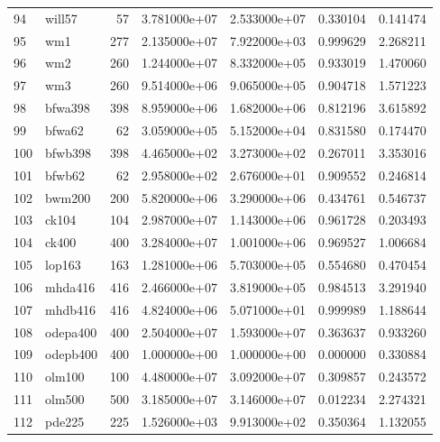 \begin{tabular}{llrrrrr}
94  &                   will57 &    57 &  3.781000e+07 &  2.533000e+07 &  0.330104 &   0.141474 \\
95  &                      wm1 &   277 &  2.135000e+07 &  7.922000e+03 &  0.999629 &   2.268211 \\
96  &                      wm2 &   260 &  1.244000e+07 &  8.332000e+05 &  0.933019 &   1.470060 \\
97  &                      wm3 &   260 &  9.514000e+06 &  9.065000e+05 &  0.904718 &   1.571223 \\
98  &                  bfwa398 &   398 &  8.959000e+06 &  1.682000e+06 &  0.812196 &   3.615892 \\
99  &                   bfwa62 &    62 &  3.059000e+05 &  5.152000e+04 &  0.831580 &   0.174470 \\
100 &                  bfwb398 &   398 &  4.465000e+02 &  3.273000e+02 &  0.267011 &   3.353016 \\
101 &                   bfwb62 &    62 &  2.958000e+02 &  2.676000e+01 &  0.909552 &   0.246814 \\
102 &                   bwm200 &   200 &  5.820000e+06 &  3.290000e+06 &  0.434761 &   0.546737 \\
103 &                    ck104 &   104 &  2.987000e+07 &  1.143000e+06 &  0.961728 &   0.203493 \\
104 &                    ck400 &   400 &  3.284000e+07 &  1.001000e+06 &  0.969527 &   1.006684 \\
105 &                   lop163 &   163 &  1.281000e+06 &  5.703000e+05 &  0.554680 &   0.470454 \\
106 &                  mhda416 &   416 &  2.466000e+07 &  3.819000e+05 &  0.984513 &   3.291940 \\
107 &                  mhdb416 &   416 &  4.824000e+06 &  5.071000e+01 &  0.999989 &   1.188644 \\
108 &                 odepa400 &   400 &  2.504000e+07 &  1.593000e+07 &  0.363637 &   0.933260 \\
109 &                 odepb400 &   400 &  1.000000e+00 &  1.000000e+00 &  0.000000 &   0.330884 \\
110 &                   olm100 &   100 &  4.480000e+07 &  3.092000e+07 &  0.309857 &   0.243572 \\
111 &                   olm500 &   500 &  3.185000e+07 &  3.146000e+07 &  0.012234 &   2.274321 \\
112 &                   pde225 &   225 &  1.526000e+03 &  9.913000e+02 &  0.350364 &   1.132055 \\

\end{tabular}
